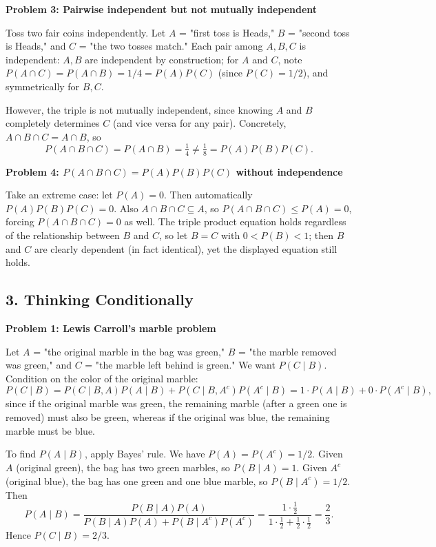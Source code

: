 \documentclass{article}
\begin{document}
\bigskip
\textbf{Problem 3: Pairwise independent but not mutually independent}

Toss two fair coins independently. Let $A$ = "first toss is Heads," $B$ = "second toss is Heads," and $C$ = "the two tosses match." Each pair among $A,B,C$ is independent: $A,B$ are independent by construction; for $A$ and $C$, note $P(A\cap C) = P(A\cap B) = 1/4 = P(A)P(C)$ (since $P(C)=1/2$), and symmetrically for $B,C$.

However, the triple is not mutually independent, since knowing $A$ and $B$ completely determines $C$ (and vice versa for any pair). Concretely, $A\cap B \cap C = A \cap B$, so
$$P(A\cap B\cap C) = P(A\cap B) = \tfrac14 \ne \tfrac18 = P(A)P(B)P(C).$$

\bigskip
\textbf{Problem 4: $P(A\cap B\cap C)=P(A)P(B)P(C)$ without independence}

Take an extreme case: let $P(A)=0$. Then automatically $P(A)P(B)P(C)=0$. Also $A\cap B\cap C \subseteq A$, so $P(A\cap B\cap C) \le P(A) = 0$, forcing $P(A\cap B\cap C)=0$ as well. The triple product equation holds regardless of the relationship between $B$ and $C$, so let $B=C$ with $0 < P(B) < 1$; then $B$ and $C$ are clearly dependent (in fact identical), yet the displayed equation still holds.

\subsection*{3. Thinking Conditionally}

\textbf{Problem 1: Lewis Carroll's marble problem}

Let $A$ = "the original marble in the bag was green," $B$ = "the marble removed was green," and $C$ = "the marble left behind is green." We want $P(C\mid B)$. Condition on the color of the original marble:
$$P(C\mid B) = P(C\mid B,A)P(A\mid B) + P(C\mid B,A^c)P(A^c\mid B) = 1\cdot P(A\mid B) + 0 \cdot P(A^c \mid B),$$
since if the original marble was green, the remaining marble (after a green one is removed) must also be green, whereas if the original was blue, the remaining marble must be blue.

To find $P(A\mid B)$, apply Bayes' rule. We have $P(A) = P(A^c) = 1/2$. Given $A$ (original green), the bag has two green marbles, so $P(B\mid A)=1$. Given $A^c$ (original blue), the bag has one green and one blue marble, so $P(B\mid A^c) = 1/2$. Then
$$P(A\mid B) = \frac{P(B\mid A)P(A)}{P(B\mid A)P(A)+P(B\mid A^c)P(A^c)} = \frac{1\cdot \tfrac12}{1\cdot\tfrac12 + \tfrac12\cdot\tfrac12} = \frac{2}{3}.$$
Hence $P(C\mid B) = 2/3$.
\end{document}
